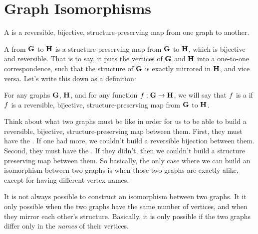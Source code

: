 \documentclass[../../../main.tex]{subfiles}
\begin{document}
\section{Graph Isomorphisms}

\begin{terminology}
  A  is a reversible, bijective, structure-preserving map from one graph to another.
\end{terminology}

 A  from $\mathbf{G}$ to $\mathbf{H}$ is a structure-preserving map from $\mathbf{G}$ to $\mathbf{H}$, which is bijective and reversible. That is to say, it puts the vertices of $\mathbf{G}$ and $\mathbf{H}$ into a one-to-one correspondence, such that the structure of $\mathbf{G}$ is exactly mirrored in $\mathbf{H}$, and vice versa. Let's write this down as a definition:

\begin{fdefinition}
  \label{def:graph-isomorphism}
  For any graphs $\mathbf{G}$, $\mathbf{H}$, and for any function $f: \mathbf{G} \rightarrow \mathbf{H}$, we will say that $f$ is a  if $f$ is a reversible, bijective, structure-preserving map from $\mathbf{G}$ to $\mathbf{H}$.
\end{fdefinition}

\begin{aside}
  \begin{remark}
    Think about what two graphs must be like in order for us to be able to build a reversible, bijective, structure-preserving map between them. First, they must have the . If one had more, we couldn't build a reversible bijection between them. Second, they must have the . If they didn't, then we couldn't build a structure preserving map between them. So basically, the only case where we can build an isomorphism between two graphs is when those two graphs are exactly alike, except for having different vertex names.
  \end{remark}
\end{aside}

It is not always possible to construct an isomorphism between two graphs. It it only possible when the two graphs have the same number of vertices, and when they mirror each other's structure. Basically, it is only possible if the two graphs differ only in the \emph{names} of their vertices.
\end{document}

